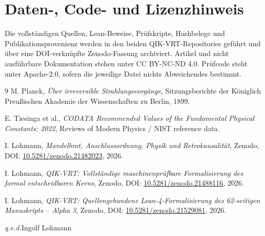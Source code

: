 \documentclass[11pt,a4paper]{article}
\begin{document}
\section*{Daten-, Code- und Lizenzhinweis}
Die vollständigen Quellen, Lean-Beweise, Prüfskripte, Hashbelege und
Publikationsprovenienz werden in den beiden QIK-VRT-Repositories geführt und
über eine DOI-verknüpfte Zenodo-Fassung archiviert. Artikel und nicht
ausführbare Dokumentation stehen unter CC BY-NC-ND 4.0. Prüfcode steht unter
Apache-2.0, sofern die jeweilige Datei nichts Abweichendes bestimmt.

\begin{thebibliography}{9}
M. Planck, \emph{Über irreversible Strahlungsvorgänge}, Sitzungsberichte der
Königlich Preußischen Akademie der Wissenschaften zu Berlin, 1899.

E. Tiesinga et al., \emph{CODATA Recommended Values of the Fundamental
Physical Constants: 2022}, Reviews of Modern Physics / NIST reference data.

I. Lohmann, \emph{Mandelbrot, Anschlussordnung, Physik und Retrokausalität},
Zenodo, DOI: \href{https://doi.org/10.5281/zenodo.21482023}{10.5281/zenodo.21482023}, 2026.

I. Lohmann, \emph{QIK-VRT: Vollständige maschinenprüfbare Formalisierung des
formal entscheidbaren Kerns}, Zenodo, DOI:
\href{https://doi.org/10.5281/zenodo.21488116}{10.5281/zenodo.21488116}, 2026.

I. Lohmann, \emph{QIK-VRT: Quellengebundene Lean-4-Formalisierung des
62-seitigen Manuskripts -- Alpha 3}, Zenodo, DOI:
\href{https://doi.org/10.5281/zenodo.21529081}{10.5281/zenodo.21529081}, 2026.
\end{thebibliography}

\vfill
\noindent\textit{q.e.d.}\hfill Ingolf Lohmann
\end{document}

